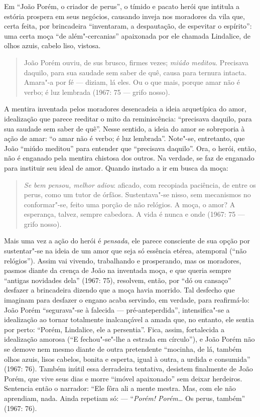 {Em “João Porém, o criador de perus”, o tímido e pacato herói que
intitula a estória prospera em seus negócios, causando inveja nos
moradores da vila que, certa feita, por brincadeira “inventaram, a
despautação, de espevitar o espírito”: uma certa moça “de
além"-cercanias” apaixonada por ele chamada Lindalice, de olhos azuis,
cabelo liso, vistosa.

\begin{quote}
João Porém ouviu, de sus brusco, firmes vezes; \emph{miúdo meditou}.
Precisava daquilo, para sua saudade sem saber de quê, causa para
ternura intacta. Amara"-a por fé --- diziam, lá eles. Ou o que mais,
porque amar não é verbo; é luz lembrada (1967: 75 --- grifo nosso).
\end{quote}

A mentira inventada pelos moradores desencadeia a ideia arquetípica do
amor, idealização que parece reeditar o mito da reminiscência:
“precisava daquilo, para sua saudade sem saber de quê”. Nesse
sentido, a ideia do amor se sobreporia à ação de amar: “o amar não é
verbo; é luz lembrada”. Note"-se, entretanto, que João “miúdo meditou”
para entender que “precisava daquilo”. Ora, o herói, então, não é
enganado pela mentira chistosa dos outros. Na verdade, se faz de
enganado para instituir seu ideal de amor. Quando instado a ir em
busca da moça:

\begin{quote}
\emph{Se bem pensou, melhor adiou}: aficado, com recopiada
paciência, de entre os perus, como um tutor de órfãos. Sustentava"-se
nisso, sem mecanismos no conformar"-se, feito uma porção de
não relógios. A moça, o amor? A esperança, talvez, sempre cabedora. A
vida é nunca e onde (1967: 75 --- grifo nosso).
\end{quote}

Mais uma vez a ação do herói é \emph{pensada}, ele parece consciente
de sua opção por sustentar"-se na ideia de um amor que seja só
essência etérea, atemporal (“não relógios”). Assim vai vivendo,
trabalhando e prosperando, mas os moradores, pasmos diante da crença
de João na inventada moça, e que queria sempre “antigas novidades
dela” (1967: 75), resolvem, então, por “dó ou cansaço” desfazer a
brincadeira dizendo que a moça havia morrido. Tal desfecho que
imaginam para desfazer o engano acaba servindo, em verdade, para
reafirmá-lo: João Porém “segurava"-se à falecida --- pré-anteperdida”,
intensifica"-se a idealização ao tornar totalmente inalcançável a
amada que, no entanto, ele sentia por perto: “Porém, Lindalice, ele a
persentia”. Fica, assim, fortalecida a idealização amorosa (“E
fechou"-se"-lhe a estrada em círculo”), e João Porém não se demove nem
mesmo diante de outra pretendente “mocinha, de lá, também olhos
azuis, lisos cabelos, bonita e esperta, igual à outra, a urdida e
consumida” (1967: 76). Também inútil essa derradeira tentativa,
desistem finalmente de João Porém, que vive seus dias e morre “imóvel
apaixonado” sem deixar herdeiros. Sentencia então o narrador: “Ele
fôra ali a mente mestra. Mas, com ele não aprendiam, nada. Ainda
repetiam só: --- ``\emph{Porém! Porém\ldots{}} Os perus, também” (1967:
76).

}
